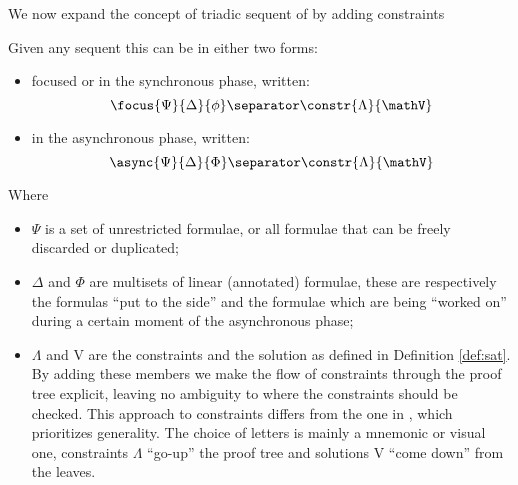We now expand the concept of triadic sequent of \cite{Focusing} by adding constraints
\begin{define}
	Given any sequent this can be in either two forms:
	\begin{itemize}
		\item focused or in the synchronous phase, written:
			$$\focus{\Psi}{\Delta}{\phi} \separator \constr{\Lambda}{\mathV}$$
		\item in the asynchronous phase, written:
			$$\async{\Psi}{\Delta}{\Phi} \separator \constr{\Lambda}{\mathV}$$
	\end{itemize}
	Where 
	\begin{itemize}
		\item $\Psi$ is a set of unrestricted formulae, or all formulae that can be freely discarded or duplicated;
		\item $\Delta$ and $\Phi$ are multisets of linear (annotated) formulae, these are respectively the formulas ``put to the side'' and the formulae which are being ``worked on'' during a certain moment of the asynchronous phase;
		\item $\Lambda$ and V are the constraints and the solution as defined in Definition \ref{def:sat}.
			By adding these members we make the flow of constraints through the proof tree explicit, leaving no ambiguity to where the constraints should be checked.
			This approach to constraints differs from the one in \cite{HarlandPym}, which prioritizes generality.
			The choice of letters is mainly a mnemonic or visual one, constraints $\Lambda$ ``go-up'' the proof tree and solutions V ``come down'' from the leaves.
	\end{itemize}
\end{define}

